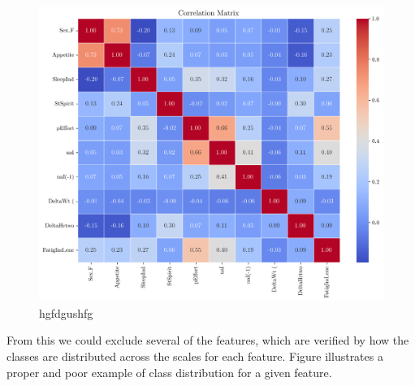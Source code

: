 \documentclass[conference]{IEEEtran}
\begin{document}
\begin{figure}[H]
    \centering
    \includegraphics[width=1\linewidth]{assets/correlation_matrix.png}
    \caption{hgfdgushfg}
    \label{fig:correlationMatrix}
\end{figure}
From this we could exclude several of the features, which are verified by how the classes are distributed across the scales for each feature. Figure illustrates a proper and poor example of class distribution for a given feature.
\end{document}
